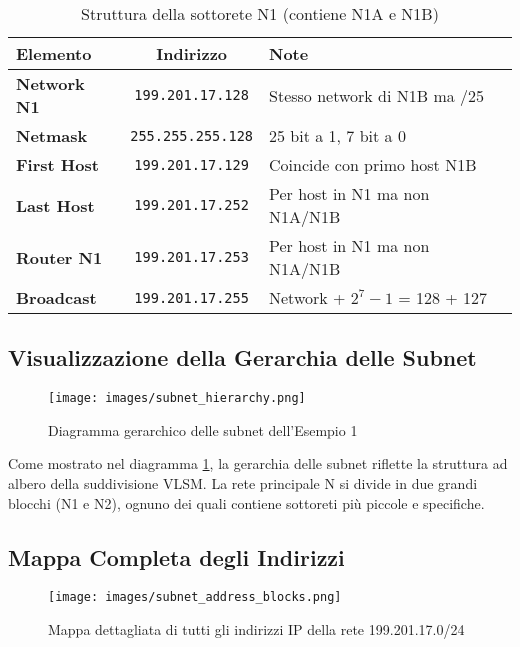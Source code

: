 \begin{table}[h]
\centering
\begin{tabular}{|l|c|l|}
\hline
\rowcolor{bg_custom}
\textcolor{primarytext}{\textbf{Elemento}} & \textcolor{primarytext}{\textbf{Indirizzo}} & \textcolor{primarytext}{\textbf{Note}} \\
\hline
\textbf{Network N1} & \texttt{199.201.17.128} & Stesso network di N1B ma /25 \\
\hline
\textbf{Netmask} & \texttt{255.255.255.128} & 25 bit a 1, 7 bit a 0 \\
\hline
\textbf{First Host} & \texttt{199.201.17.129} & Coincide con primo host N1B \\
\hline
\textbf{Last Host} & \texttt{199.201.17.252} & Per host in N1 ma non N1A/N1B \\
\hline
\textbf{Router N1} & \texttt{199.201.17.253} & Per host in N1 ma non N1A/N1B \\
\hline
\textbf{Broadcast} & \texttt{199.201.17.255} & Network + $2^7 - 1$ = 128 + 127 \\
\hline
\end{tabular}
\caption{Struttura della sottorete N1 (contiene N1A e N1B)}
\end{table}

\subsection{Visualizzazione della Gerarchia delle Subnet}

\begin{figure}[H]
\centering
\texttt{[image: images/subnet\_hierarchy.png]}
\caption{Diagramma gerarchico delle subnet dell'Esempio 1}
\label{fig:subnet_hierarchy}
\end{figure}

Come mostrato nel diagramma \ref{fig:subnet_hierarchy}, la gerarchia delle subnet riflette la struttura ad albero della suddivisione VLSM. La rete principale N si divide in due grandi blocchi (N1 e N2), ognuno dei quali contiene sottoreti più piccole e specifiche.

\subsection{Mappa Completa degli Indirizzi}

\begin{figure}[H]
\centering
\texttt{[image: images/subnet\_address\_blocks.png]}
\caption{Mappa dettagliata di tutti gli indirizzi IP della rete 199.201.17.0/24}
\label{fig:subnet_blocks}
\end{figure}

